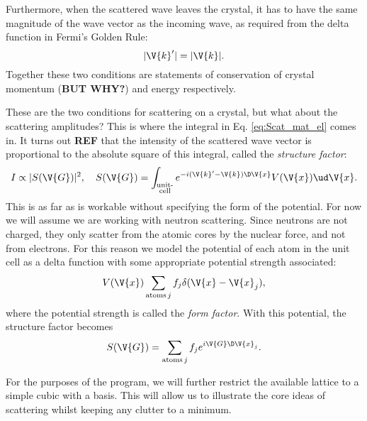 \documentclass[main.tex]{subfiles}
\begin{document}
	Furthermore, when the scattered wave leaves the crystal, it has to have the same magnitude of the wave vector as the incoming wave, as required from the delta function in Fermi's Golden Rule:
	\begin{equation}\label{eq:Scat_E_cons}
		|\V{k}'| = |\V{k}|.
	\end{equation}
	Together these two conditions are statements of conservation of crystal momentum (\textbf{BUT WHY?}) and energy respectively.
	
	These are the two conditions for scattering on a crystal, but what about the scattering amplitudes? This is where the integral in Eq. \eqref{eq:Scat_mat_el} comes in. It turns out \textbf{REF} that the intensity of the scattered wave vector is proportional to the absolute square of this integral, called the \textit{structure factor}:
	\begin{equation}
		I \propto |S(\V{G})|^2, \quad S(\V{G}) = \int_{\substack{\text{unit-} \\\text{cell}}} e^{-i (\V{k}'-\V{k}) \D \V{x}} V(\V{x}) \ud \V{x}.
	\end{equation}
	This is as far as is workable without specifying the form of the potential. For now we will assume we are working with neutron scattering. Since neutrons are not charged, they only scatter from the atomic cores by the nuclear force, and not from electrons. For this reason we model the potential of each atom in the unit cell as a delta function with some appropriate potential strength associated:
	\begin{equation}\label{eq:Scat_neutron_pot}
		V(\V{x}) \sum_{\text{atoms} \,j} f_j \delta(\V{x}-\V{x}_j),
	\end{equation}
	where the potential strength is called the \textit{form factor}. With this potential, the structure factor becomes
	\begin{equation}\label{eq:Scat_struct}
		S(\V{G}) = \sum_{\text{atoms} \,j} f_j e^{i \V{G} \D \V{x}_j}.
	\end{equation}
	
	For the purposes of the program, we will further restrict the available lattice to a simple cubic with a basis. This will allow us to illustrate the core ideas of scattering whilst keeping any clutter to a minimum.
	
\end{document}
